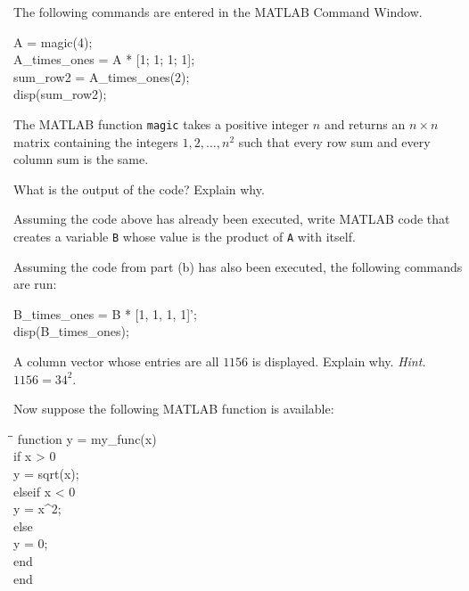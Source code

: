 \documentclass[11pt,oneside]{article}
\begin{document}
\begin{problem}
The following commands are entered in the MATLAB Command Window.

{\small\ttfamily
\begin{tabbing}
A = magic(4);\\
A\_times\_ones = A * [1; 1; 1; 1];\\
sum\_row2 = A\_times\_ones(2);\\
disp(sum\_row2);
\end{tabbing}
}

The MATLAB function \texttt{magic} takes a positive integer $n$ and returns an $n\times n$ matrix containing the integers $1,2,\dots,n^2$ such that every row sum and every column sum is the same.

\begin{problemsubparts}
\item What is the output of the code? Explain why.
\item Assuming the code above has already been executed, write MATLAB code that creates a variable \texttt{B} whose value is the product of \texttt{A} with itself.
\item Assuming the code from part \textup{(b)} has also been executed, the following commands are run:

{\small\ttfamily
\begin{tabbing}
B\_times\_ones = B * [1, 1, 1, 1]';\\
disp(B\_times\_ones);
\end{tabbing}
}

A column vector whose entries are all $1156$ is displayed. Explain why. \textit{Hint.} $1156=34^2$.
\end{problemsubparts}

Now suppose the following MATLAB function is available:

{\small\ttfamily
\begin{tabbing}
\hspace{2em}\=\hspace{2em}\=\kill
function y = my\_func(x)\\
\>if x > 0\\
\>\>y = sqrt(x);\\
\>elseif x < 0\\
\>\>y = x\string^2;\\
\>else\\
\>\>y = 0;\\
\>end\\
end
\end{tabbing}
}


\end{problem}
\end{document}
